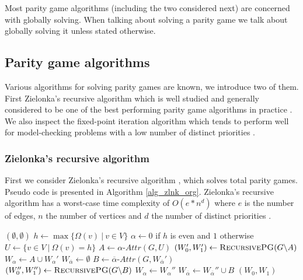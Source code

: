 Most parity game algorithms (including the two considered next) are concerned with globally solving. When talking about solving a parity game we talk about globally solving it unless stated otherwise. 

\subsection{Parity game algorithms}
Various algorithms for solving parity games are known, we introduce two of them. First Zielonka's recursive algorithm which is well studied and generally considered to be one of the best performing parity game algorithms in practice \cite{Oink,SolvingPGInPractice}. We also inspect the fixed-point iteration algorithm which tends to perform well for model-checking problems with a low number of distinct priorities \cite{BDDSolvingPG}.

\subsubsection{Zielonka's recursive algorithm}
First we consider Zielonka's recursive algorithm \cite{ZIELONKA1998135,MCNAUGHTON1993149}, which solves total parity games. Pseudo code is presented in Algorithm \ref{alg_zlnk_org}. Zielonka's recursive algorithm has a worst-case time complexity of $O(e*n^d)$ where $e$ is the number of edges, $n$ the number of vertices and $d$ the number of distinct priorities \cite{friedmanPG}.
\begin{algorithm}
	\caption{$\textsc{RecursivePG}(\textit{parity game } G = (V,V_0,V_1, E, \Omega))$}
	\label{alg_zlnk_org}
	\begin{algorithmic}[1]
		\State \Return $(\emptyset, \emptyset)$
		\EndIf
		\State $h \gets\max\{ \Omega(v)\ |\ v \in V\}$
		\State $\alpha \gets 0$ if $h$ is even and $1$ otherwise
		\State $U \gets \{v \in V\ |\ \Omega(v) = h\}$
		\State $A \gets \alpha\textit{-Attr}(G, U)$
		\State $(W_0', W_1') \gets \textsc{RecursivePG}(G \backslash A)$
		\State $W_\alpha \gets A \cup W_\alpha'$
		\State $W_{\overline{\alpha}} \gets \emptyset$
		\Else
		\State $B \gets \overline{\alpha}\textit{-Attr}(G,W_{\overline{\alpha}}')$
		\State $(W_0'', W_1'') \gets \textsc{RecursivePG}(G \backslash B)$
		\State $W_\alpha \gets W_\alpha''$
		\State $W_{\overline{\alpha}} \gets W_{\overline{\alpha}}'' \cup B$
		\EndIf
		\State \Return $(W_0, W_1)$
	\end{algorithmic}
\end{algorithm}

